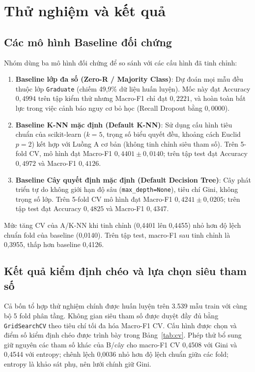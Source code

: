 \chapter{Thử nghiệm và kết quả}

\section{Các mô hình Baseline đối chứng}
Nhóm dùng ba mô hình đối chứng để so sánh với các cấu hình đã tinh chỉnh:
\begin{enumerate}
    \item \textbf{Baseline lớp đa số (Zero-R / Majority Class)}: Dự đoán mọi mẫu đều thuộc lớp \texttt{Graduate} (chiếm 49,9\% dữ liệu huấn luyện). Mốc này đạt Accuracy $0{,}4994$ trên tập kiểm thử nhưng Macro-F1 chỉ đạt $0{,}2221$, và hoàn toàn bất lực trong việc cảnh báo nguy cơ bỏ học (Recall Dropout bằng $0{,}0000$).
    \item \textbf{Baseline K-NN mặc định (Default K-NN)}: Sử dụng cấu hình tiêu chuẩn của scikit-learn ($k=5$, trọng số biểu quyết đều, khoảng cách Euclid $p=2$) kết hợp với Luồng A cơ bản (không tinh chỉnh siêu tham số). Trên 5-fold CV, mô hình đạt Macro-F1 $0{,}4401 \pm 0{,}0140$; trên tập test đạt Accuracy $0{,}4972$ và Macro-F1 $0{,}4126$.
    \item \textbf{Baseline Cây quyết định mặc định (Default Decision Tree)}: Cây phát triển tự do không giới hạn độ sâu (\texttt{max\_depth=None}), tiêu chí Gini, không trọng số lớp. Trên 5-fold CV mô hình đạt Macro-F1 $0{,}4241 \pm 0{,}0205$; trên tập test đạt Accuracy $0{,}4825$ và Macro-F1 $0{,}4347$.
\end{enumerate}
Mức tăng CV của A/K-NN khi tinh chỉnh (0,4401 lên 0,4455) nhỏ hơn độ lệch chuẩn fold của baseline (0,0140). Trên tập test, macro-F1 sau tinh chỉnh là 0,3955, thấp hơn baseline 0,4126.

\section{Kết quả kiểm định chéo và lựa chọn siêu tham số}
Cả bốn tổ hợp thử nghiệm chính được huấn luyện trên 3.539 mẫu train với cùng bộ 5 fold phân tầng. Không gian siêu tham số được duyệt đầy đủ bằng \texttt{GridSearchCV} theo tiêu chí tối đa hóa Macro-F1 CV. Cấu hình được chọn và điểm số kiểm định chéo được trình bày trong Bảng~\ref{tab:cv}. Phép thử bổ sung giữ nguyên các tham số khác của B/cây cho macro-F1 CV 0,4508 với Gini và 0,4544 với entropy; chênh lệch 0,0036 nhỏ hơn độ lệch chuẩn giữa các fold; entropy là khảo sát phụ, nên lưới chính giữ Gini.

